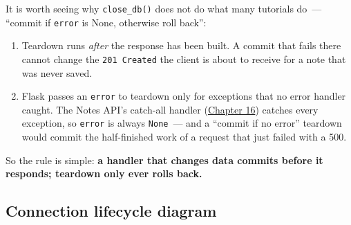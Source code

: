 \noindent{}It is worth seeing why \texttt{close\_db()} does not do what many tutorials do~--- ``commit if \texttt{error} is None, otherwise roll back'':

\begin{enumerate}
\def\labelenumi{\arabic{enumi}.}
\tightlist
\item
  Teardown runs \emph{after} the response has been built. A commit that fails there cannot change the \texttt{201\ Created} the client is about to receive for a note that was never saved.
\item
  Flask passes an \texttt{error} to teardown only for exceptions that no error handler caught. The Notes API's catch-all handler (\hyperref[ch:16-logging-error-handling]{Chapter 16}) catches every exception, so \texttt{error} is always \texttt{None}~--- and a ``commit if no error'' teardown would commit the half-finished work of a request that just failed with a 500.
\end{enumerate}

\noindent{}So the rule is simple: \textbf{a handler that changes data commits before it responds; teardown only ever rolls back.}

\begin{codebox}[short]

\begin{Shaded}
\begin{Highlighting}[]

\OperatorTok{=}\NormalTok{)}
\end{Highlighting}
\end{Shaded}

\end{codebox}

\subsection*{Connection lifecycle diagram}\label{33-logic-execution:connection-lifecycle-diagram}

